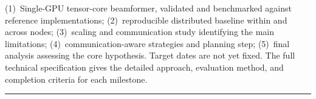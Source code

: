 \documentclass[10pt,letterpaper]{article}
\begin{document}
(1)~Single-GPU tensor-core beamformer, validated and benchmarked against reference implementations; (2)~reproducible distributed baseline within and across nodes; (3)~scaling and communication study identifying the main limitations; (4)~communication-aware strategies and planning step; (5)~final analysis assessing the core hypothesis. Target dates are not yet fixed. The full technical specification gives the detailed approach, evaluation method, and completion criteria for each milestone.

\vspace{1pt}\hrule\vspace{1pt}
{\setlength{\parskip}{0pt}\printbibliography[heading=none]}
\end{document}
